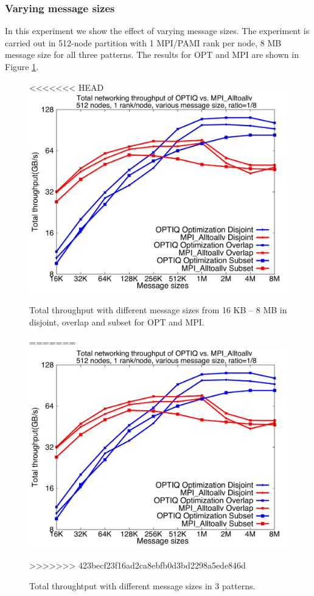\subsubsection{Varying message sizes}

In this experiment we show the effect of varying message sizes. The experiment is carried out in 512-node partition with 1 MPI/PAMI rank per node, 8 MB message size for all three patterns. The results for OPT and MPI are shown in Figure \ref{fig:messagesize}.
\begin{figure}[!htb]
\vspace{-0.15in}
\centering
<<<<<<< HEAD
\includegraphics[scale=0.30]{figures/messagesize.pdf}
\vspace{-0.1in}
\caption{Total throughput with different message sizes from 16 KB -- 8 MB in disjoint, overlap and subset for OPT and MPI.}
\vspace{-0.1in}
=======
\includegraphics[scale=0.27]{figures/messagesize.pdf}
\vspace{-0.15in}
\caption{Total throughtput with different message sizes in 3 patterns.}
\vspace{-0.15in}
>>>>>>> 423becf23f16ad2ca8ebfb0d3bd2298a5ede846d
\label{fig:messagesize}
\end{figure}
